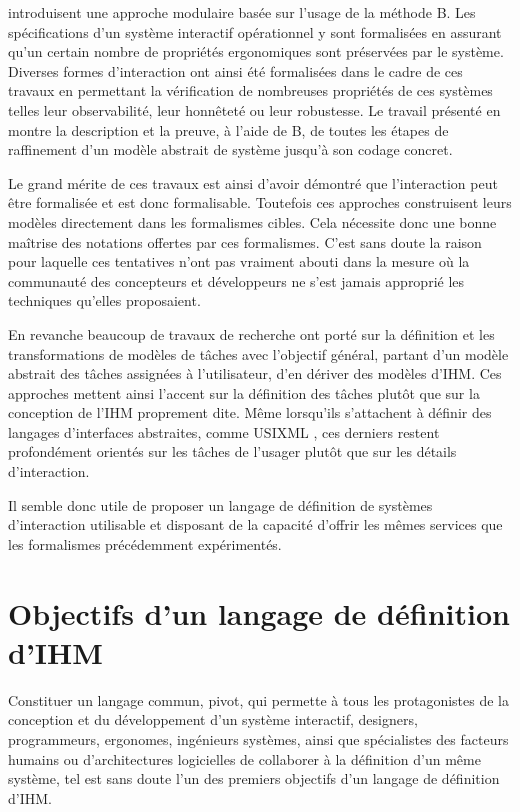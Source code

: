 \documentclass{ihm}
\begin{document}
\cite{yamine98a,yamine98b} introduisent  une approche  modulaire basée
sur  l'usage  de  la  méthode  B.   Les  spécifications  d'un  système
interactif opérationnel  y sont formalisées en  assurant qu'un certain
nombre   de   propriétés   ergonomiques   sont   préservées   par   le
système. Diverses formes d'interaction  ont ainsi été formalisées dans
le cadre  de ces travaux  en permettant la vérification  de nombreuses
propriétés de  ces systèmes telles leur  observabilité, leur honnêteté
ou leur robustesse.  Le travail  présenté en \cite{yamine00} montre la
description  et la  preuve, à  l'aide de  B, de  toutes les  étapes de
raffinement  d'un  modèle  abstrait  de  système  jusqu'à  son  codage
concret.

Le  grand  mérite  de  ces  travaux est  ainsi  d'avoir  démontré  que
l'interaction peut être formalisée et est donc formalisable. Toutefois
ces  approches   construisent  leurs  modèles  directement   dans  les
formalismes  cibles.   Cela  nécessite  donc une  bonne  maîtrise  des
notations offertes  par ces  formalismes. C'est  sans doute  la raison
pour laquelle ces tentatives n'ont  pas vraiment abouti dans la mesure
où  la communauté  des  concepteurs et  développeurs  ne s'est  jamais
approprié les techniques qu'elles proposaient.

En  revanche  beaucoup  de  travaux  de recherche  ont  porté  sur  la
définition et les transformations de modèles de tâches avec l'objectif
général,  partant   d'un  modèle  abstrait  des   tâches  assignées  à
l'utilisateur, d'en dériver des  modèles d'IHM.  Ces approches mettent
ainsi  l'accent  sur  la  définition  des tâches  plutôt  que  sur  la
conception de  l'IHM proprement  dite.  Même lorsqu'ils  s'attachent à
définir   des   langages   d'interfaces   abstraites,   comme   USIXML
\cite{UsiXML},  ces derniers  restent  profondément  orientés sur  les
tâches de l'usager plutôt que sur les détails d'interaction.

Il semble donc utile de proposer  un langage de définition de systèmes
d'interaction  utilisable et  disposant  de la  capacité d'offrir  les
mêmes services que les formalismes précédemment expérimentés.

\section{Objectifs d'un langage de définition d'IHM} 

Constituer  un  langage  commun,  pivot,   qui  permette  à  tous  les
protagonistes  de  la  conception  et du  développement  d'un  système
interactif, designers,  programmeurs, ergonomes,  ingénieurs systèmes,
ainsi  que  spécialistes  des   facteurs  humains  ou  d'architectures
logicielles de collaborer  à la définition d'un même  système, tel est
sans  doute l'un  des premiers  objectifs d'un  langage de  définition
d'IHM.
\end{document}
